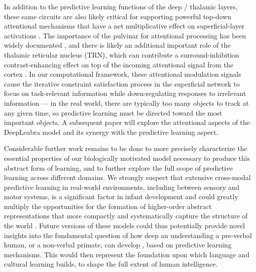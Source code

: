 \documentclass[11pt,twoside]{article}
\newif\myifpdf
\begin{document}
In addition to the predictive learning functions of the deep / thalamic layers, these same circuits are also likely critical for supporting powerful top-down attentional mechanisms that have a net multiplicative effect on superficial-layer activations \cite{BortoneOlsenScanziani14,OlsenBortoneAdesnikEtAl12,BortoneOlsenScanziani14,OlsenBortoneAdesnikEtAl12}. The importance of the pulvinar for attentional processing has been widely documented \cite[e.g.,]{LaBergeBuchsbaum90,BenderYouakim01,SaalmannPinskWangEtAl12}, and there is likely an additional important role of the thalamic reticular nucleus (TRN), which can contribute a surround-inhibition contrast-enhancing effect on top of the incoming attentional signal from the cortex \cite{Crick84,Pinault04,WimmerSchmittDavidsonEtAl15}.  In our computational framework, these attentional modulation signals cause the iterative constraint satisfaction process in the superficial network to focus on task-relevant information while down-regulating responses to irrelevant information --- in the real world, there are typically too many objects to track at any given time, so predictive learning must be directed toward the most important objects. A subsequent paper will explore the attentional aspects of the DeepLeabra model and its synergy with the predictive learning aspect.


Considerable further work remains to be done to more precisely characterize the essential properties of our biologically motivated model necessary to produce this abstract form of learning, and to further explore the full scope of predictive learning across different domains.  We strongly suspect that extensive cross-modal predictive learning in real-world environments, including between sensory and motor systems, is a significant factor in infant development and could greatly multiply the opportunities for the formation of higher-order abstract representations that more compactly and systematically capture the structure of the world \cite{YuSmith12}.  Future versions of these models could thus potentially provide novel insights into the fundamental question of how deep an understanding a pre-verbal human, or a non-verbal primate, can develop \cite{SpelkeBreinlingerMacomberEtAl92,ElmanBatesKarmiloff-SmithEtAl96}, based on predictive learning mechanisms.  This would then represent the foundation upon which language and cultural learning builds, to shape the full extent of human intelligence.



\end{document}
